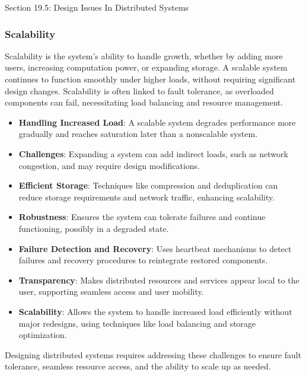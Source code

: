 \begin{notes}{Section 19.5: Design Issues In Distributed Systems}
\begin{highlight}[Transparency]
    \end{highlight}
    
    \subsubsection*{Scalability}
    
    Scalability is the system's ability to handle growth, whether by adding more users, increasing computation power, or expanding storage. A scalable system continues to function smoothly under 
    higher loads, without requiring significant design changes. Scalability is often linked to fault tolerance, as overloaded components can fail, necessitating load balancing and resource management.
    
    \begin{highlight}[Scalability]
    
        \begin{itemize}
            \item \textbf{Handling Increased Load}: A scalable system degrades performance more gradually and reaches saturation later than a nonscalable system.
            \item \textbf{Challenges}: Expanding a system can add indirect loads, such as network congestion, and may require design modifications.
            \item \textbf{Efficient Storage}: Techniques like compression and deduplication can reduce storage requirements and network traffic, enhancing scalability.
        \end{itemize}
    
    \end{highlight}
    
    \begin{highlight}
    
        \begin{itemize}
            \item \textbf{Robustness}: Ensures the system can tolerate failures and continue functioning, possibly in a degraded state.
            \item \textbf{Failure Detection and Recovery}: Uses heartbeat mechanisms to detect failures and recovery procedures to reintegrate restored components.
            \item \textbf{Transparency}: Makes distributed resources and services appear local to the user, supporting seamless access and user mobility.
            \item \textbf{Scalability}: Allows the system to handle increased load efficiently without major redesigns, using techniques like load balancing and storage optimization.
        \end{itemize}
    
    Designing distributed systems requires addressing these challenges to ensure fault tolerance, seamless resource access, and the ability to scale up as needed.
    
    \end{highlight}
\end{notes}

